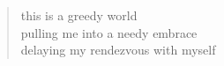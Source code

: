 
\begin{verse}
this is a greedy world \\
pulling me into a needy embrace \\
delaying my rendezvous with myself
\end{verse}
